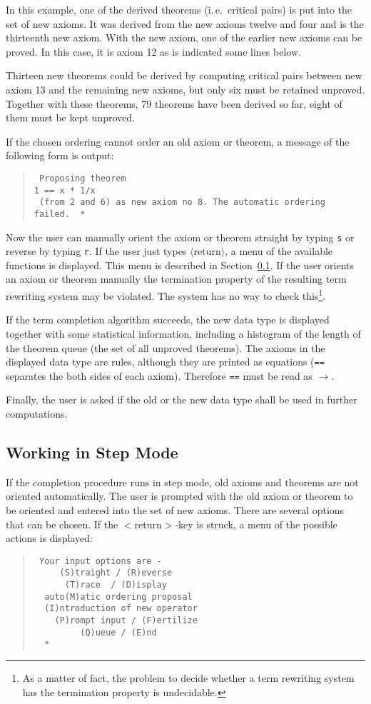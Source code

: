 In this example, one of the derived theorems (i.\,e.\  critical pairs) is put
into the set of new axioms. It was derived from the new axioms twelve and
four and is the thirteenth new axiom. With the new axiom, one of the earlier
new axioms can be proved. In this case, it is axiom 12 as is indicated some
lines below.

Thirteen new theorems could be derived by computing critical pairs between
new axiom 13 and the remaining new axioms,
but only six must  be retained
unproved. Together with these theorems, 79 theorems have been derived so far,
eight of them must be kept unproved.

If the chosen ordering cannot order an old axiom or theorem, a message
of the following form is output:
\begin{quote}
\begin{verbatim}
 Proposing theorem
1 == x * 1/x
 (from 2 and 6) as new axiom no 8. The automatic ordering failed.  *
\end{verbatim}
\end{quote}
Now the user can manually orient the axiom or theorem straight by typing 
{\tt s} or
reverse by typing {\tt r}. If the user just types $\langle$return$\rangle$,
a menu of the
available functions is displayed. This menu is described in 
Section~\ref{StepMode}. If the user orients an axiom or theorem 
manually the termination 
property of the resulting term rewriting system may be violated. The system 
has no way to check this\footnote{As a matter of fact, the problem to 
decide whether a term rewriting system has the termination property is
undecidable.}.

If the term completion algorithm succeeds, the new data type is
displayed together with some statistical information, including a
histogram of the length of the theorem queue (the set of all 
unproved theorems).
The axioms in the displayed data type are rules, although they are
printed as equations ({\tt ==} separates the both sides of each axiom).
Therefore {\tt ==} must be read as $\rightarrow$.

Finally, the user is asked if the old or the new data type shall
be used in further computations.

\subsection{Working in Step Mode}
\label{StepMode}
If the completion procedure runs in step mode, old axioms and theorems
are not oriented automatically. The user is prompted with the
old axiom or theorem to be oriented and entered into the set of new axioms.
There are several options that can be chosen. If the $<$return$>$-key is struck,
a menu of the possible actions is displayed:
\begin{quote}
\begin{verbatim}
 Your input options are -
     (S)traight / (R)everse
      (T)race  / (D)isplay
  auto(M)atic ordering proposal
  (I)ntroduction of new operator
    (P)rompt input / (F)ertilize
         (Q)ueue / (E)nd
  *
\end{verbatim}
\end{quote}

